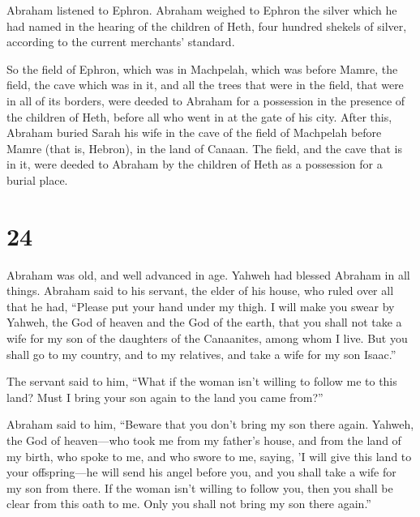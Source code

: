  Abraham listened to Ephron. Abraham weighed to Ephron
the silver which he had named in the hearing of the children of Heth,
four hundred shekels of silver, according to the current merchants'
standard.

 So the field of Ephron, which was in Machpelah, which
was before Mamre, the field, the cave which was in it, and all the trees
that were in the field, that were in all of its borders, were deeded
 to Abraham for a possession in the presence of the
children of Heth, before all who went in at the gate of his city.
 After this, Abraham buried Sarah his wife in the cave of
the field of Machpelah before Mamre (that is, Hebron), in the land of
Canaan.  The field, and the cave that is in it, were
deeded to Abraham by the children of Heth as a possession for a burial
place.

\hypertarget{section-23}{%
\section{24}\label{section-23}}

 Abraham was old, and well advanced in age. Yahweh had
blessed Abraham in all things.  Abraham said to his
servant, the elder of his house, who ruled over all that he had,
``Please put your hand under my thigh.  I will make you
swear by Yahweh, the God of heaven and the God of the earth, that you
shall not take a wife for my son of the daughters of the Canaanites,
among whom I live.  But you shall go to my country, and to
my relatives, and take a wife for my son Isaac.''

 The servant said to him, ``What if the woman isn't
willing to follow me to this land? Must I bring your son again to the
land you came from?''

 Abraham said to him, ``Beware that you don't bring my son
there again.  Yahweh, the God of heaven---who took me from
my father's house, and from the land of my birth, who spoke to me, and
who swore to me, saying, 'I will give this land to your offspring---he
will send his angel before you, and you shall take a wife for my son
from there.  If the woman isn't willing to follow you,
then you shall be clear from this oath to me. Only you shall not bring
my son there again.''

